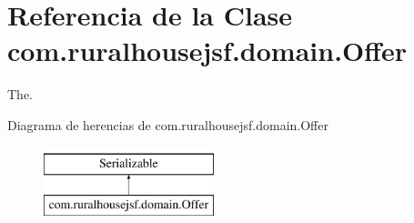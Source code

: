 \hypertarget{classcom_1_1ruralhousejsf_1_1domain_1_1_offer}{}\section{Referencia de la Clase com.\+ruralhousejsf.\+domain.\+Offer}
\label{classcom_1_1ruralhousejsf_1_1domain_1_1_offer}


The.  


Diagrama de herencias de com.\+ruralhousejsf.\+domain.\+Offer\begin{figure}[H]
\begin{center}
\leavevmode
\includegraphics[height=2.000000cm]{db/db8/classcom_1_1ruralhousejsf_1_1domain_1_1_offer}
\end{center}
\end{figure}
